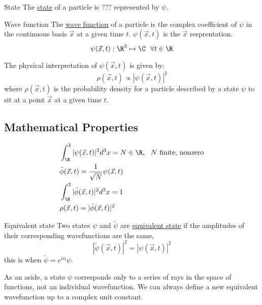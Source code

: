\documentclass[../Main.tex]{subfiles}
\begin{document}
\begin{definition}{State}
    The \underline{state} of a particle is ??? represented by $\psi$. %
\end{definition}
\begin{definition}{Wave function}
    The \underline{wave function} of a particle is the complex coefficient of $\psi$ in the continuous basis $\vec{x}$ at a given time $t$. $\psi(\vec{x}, t)$ is the $\vec{x}$ resprentation.
    \begin{equation*}
        \psi(\vec{x}, t) : \R^3 \mapsto \C~~\forall t \in \R
    \end{equation*}
\end{definition}
The physical interpretation of $\psi(\vec{x}, t)$ is given by:
\begin{equation}
    \rho(\vec{x}, t) \propto |\psi(\vec{x}, t)|^2
    \label{eqnProbAmplitude}
\end{equation}
where $\rho(\vec{x}, t)$ is the probability density for a particle described by a state $\psi$ to sit at a point $\vec{x}$ at a given time $t$.

\subsection{Mathematical Properties}
\begin{align}
    &\int_\R^3 |\psi(\vec{x}, t)|^2 d^3 x = N \in \R,~~N \text{ finite, nonzero} \label{eqnWFTotIntegral} \\
    &\ybar(\vec{x}, t) = \frac{1}{\sqrt{N}} \psi(\vec{x}, t) \label{eqnPhiBar} \\
    &\int_\R^3 |\ybar(\vec{x}, t)|^2 d^3 x = 1 \label{eqnWFInt1} \\
    &\rho(\vec{x}, t) = |\ybar(\vec{x}, t)|^2 \label{eqnWFProbDens}
\end{align}
\begin{definition}{Equivalent state}
    Two states $\psi$ and $\tilde{\psi}$ are \underline{equivalent state} if the amplitudes of their corresponding wavefunctions are the same,
    \begin{equation*}
        |\tilde{\psi}(\vec{x}, t)|^2 = |\psi(\vec{x}, t)|^2
    \end{equation*}
    this is when $\tilde{\psi} = e^{i\alpha} \psi$.
\end{definition}
\begin{remark}
    As an aside, a state $\psi$ corresponds only to a series of rays in the space of functions, not an individual wavefunction. We can always define a new equivalent wavefunction up to a complex unit constant.
\end{remark}
\end{document}
